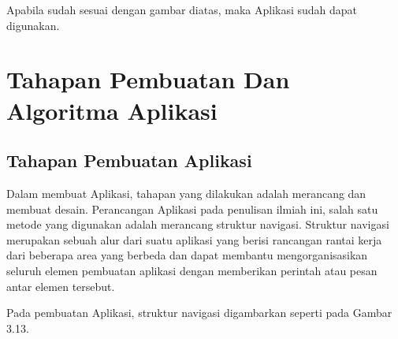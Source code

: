 \documentclass[pi.tex]{subfile}
\begin{document}
  \hspace{10pt}Apabila sudah sesuai dengan gambar diatas, maka Aplikasi sudah dapat digunakan.

\section{Tahapan Pembuatan Dan Algoritma Aplikasi}
\subsection{Tahapan Pembuatan Aplikasi}\hspace{5pt}
Dalam membuat Aplikasi, tahapan yang dilakukan adalah merancang dan membuat desain. Perancangan Aplikasi pada penulisan ilmiah ini, salah satu metode yang digunakan adalah merancang struktur navigasi. Struktur navigasi merupakan sebuah alur dari suatu aplikasi yang berisi rancangan rantai kerja dari beberapa area yang berbeda dan dapat membantu mengorganisasikan seluruh elemen pembuatan aplikasi dengan memberikan perintah atau pesan antar elemen tersebut.

\hspace{10pt}Pada pembuatan Aplikasi, struktur navigasi digambarkan seperti pada Gambar 3.13.
\end{document}
